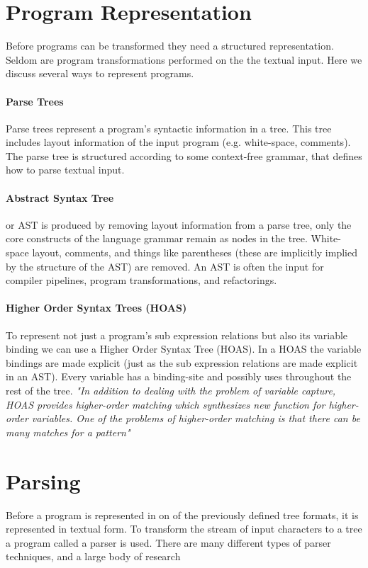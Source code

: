 \section{Program Representation} \label{program-representation}
Before programs can be transformed they need a structured representation. Seldom are program transformations performed on the the textual input. Here we discuss several ways to represent programs.

\paragraph{Parse Trees}
Parse trees represent a program's syntactic information in a tree. This tree includes layout information of the input program (e.g. white-space, comments). The parse tree is structured according to some context-free grammar, that defines how to parse textual input.

\paragraph{Abstract Syntax Tree}
or AST is produced by removing layout information from a parse tree, only the core constructs of the language grammar remain as nodes in the tree. White-space layout, comments, and things like parentheses (these are implicitly implied by the structure of the AST) are removed. An AST is often the input for compiler pipelines, program transformations, and refactorings.

\paragraph{Higher Order Syntax Trees (HOAS)}
To represent not just a program's sub expression relations but also its variable binding we can use a Higher Order Syntax Tree (HOAS)\cite{Pfenning1988}. In a HOAS the variable bindings are made explicit (just as the sub expression relations are made explicit in an AST). Every variable has a binding-site and possibly uses throughout the rest of the tree. \textit{"In addition to dealing with the problem of variable capture, HOAS provides higher-order matching which synthesizes new function for higher-order  variables. One of the problems of higher-order matching is that there can be many matches for a pattern"}~\cite{Visser2001}

\section{Parsing} \label{parsing}
Before a program is represented in on of the previously defined tree formats, it is represented in textual form. To transform the stream of input characters to a tree a program called a parser is used. There are many different types of parser techniques, and a large body of research~\cite{Visser1997,VandenBrand2002,Salomon1989}

